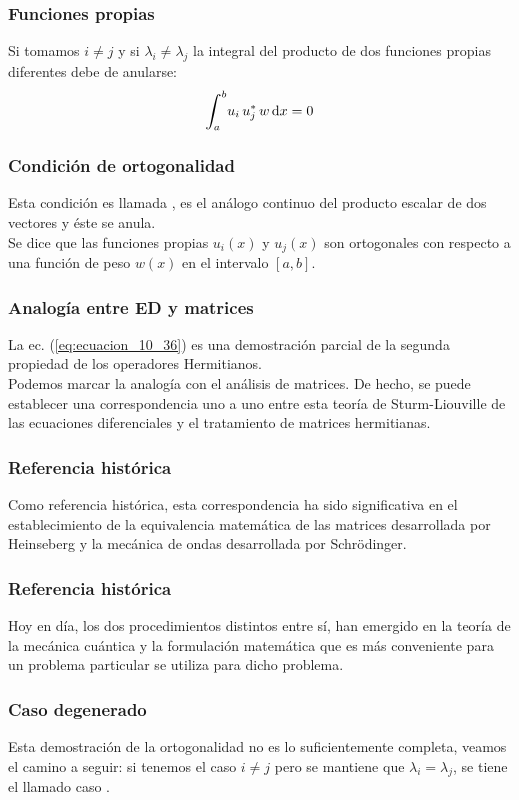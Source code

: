 \documentclass[12pt]{beamer}
\begin{document}
\begin{frame}
\frametitle{Funciones propias}
Si tomamos $i \neq	j$ y si $\lambda_{i} \neq \lambda_{j}$ la integral del producto de dos funciones propias diferentes debe de anularse:
\pause
\begin{align}
\scaleint{6ex}_{\bs a}^{b} u_{i} \, u_{j}^{*} \, w \dd{x} = 0
\label{eq:ecuacion_10_36}
\end{align}
\end{frame}
\begin{frame}
\frametitle{Condición de ortogonalidad}
Esta condición es llamada , es el análogo continuo del producto escalar de dos vectores y éste se anula.
\\
\bigskip
\pause
Se dice que las funciones propias $u_{i}(x)$ y $u_{j}(x)$ son ortogonales con respecto a una función de peso $w(x)$ en el intervalo $[a,b]$.
\end{frame}
\begin{frame}
\frametitle{Analogía entre ED y matrices}
La ec. (\ref{eq:ecuacion_10_36}) es una demostración parcial de la segunda propiedad de los operadores Hermitianos. 
\\
\bigskip
\pause
Podemos marcar la analogía con el análisis de matrices. De hecho, se puede establecer una correspondencia uno a uno entre esta teoría de Sturm-Liouville de las ecuaciones diferenciales y el tratamiento de matrices hermitianas.
\end{frame}
\begin{frame}
\frametitle{Referencia histórica}
Como referencia histórica, esta correspondencia ha sido significativa en el establecimiento de la equivalencia matemática de las matrices desarrollada por Heinseberg y la mecánica de ondas desarrollada por Schrödinger.
\end{frame}
\begin{frame}
\frametitle{Referencia histórica}
Hoy en día, los dos procedimientos distintos entre sí, han emergido en la teoría de la mecánica cuántica y la formulación matemática que es más conveniente para un problema particular se utiliza para dicho problema.
\end{frame}
\begin{frame}
\frametitle{Caso degenerado}
Esta demostración de la ortogonalidad no es lo suficientemente completa, veamos el camino a seguir: \pause si tenemos el caso $i \neq j$ pero se mantiene que $\lambda_{i} = \lambda_{j}$, se tiene el llamado caso . 
\end{frame}
\end{document}
